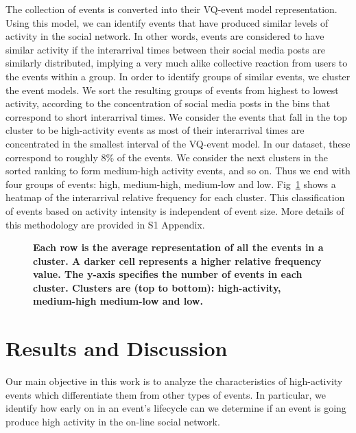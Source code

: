 \documentclass[10pt,letterpaper]{article}
\newcommand{\newtext}[1]{{\leavevmode\color{blue}#1}}
\begin{document}
The collection of events is converted into their VQ-event model
representation. Using this model, we can identify events that have
produced similar levels of activity in the social network. In other
words, events are considered to have similar activity if the
interarrival times between their social media posts are similarly
distributed, implying a very much alike collective reaction from users
to the events within a group. In order to identify groups of similar
events, we cluster the event models. We sort the resulting groups of
events from highest to lowest activity, according to the concentration
of social media posts in the bins that correspond to short
interarrival times. We consider the events that fall in the top
cluster to be high-activity events as most of their interarrival times
are concentrated in the smallest interval of the VQ-event model.  In
our dataset, these correspond to roughly 8\% of the events.  We
consider the next clusters in the sorted ranking to form medium-high
activity events, and so on.  Thus we end with four groups of events:
high, medium-high, medium-low and low. Fig~\ref{fig:fig3} shows a
heatmap of the interarrival relative frequency for each cluster. This
classification of events based on activity intensity is independent of
event size. More details of this methodology are provided in S1 Appendix.

\begin{figure}[!htb]
  \caption{\textbf{Each row is the average representation of all the
      events in a cluster.  A darker cell represents a higher
      relative frequency value.  The y-axis specifies the number of events in
      each
      cluster.  Clusters are (top to bottom): high-activity, medium-high
      medium-low and low.}
  }
  \label{fig:fig3}
\end{figure}

\section*{Results and Discussion}
Our main objective in this work is to analyze the
  characteristics of high-activity events which differentiate them from
  other types of events. In particular, we identify how early on in an
  event's lifecycle can we determine if an event is going
  produce high activity in the on-line social network.
\end{document}
